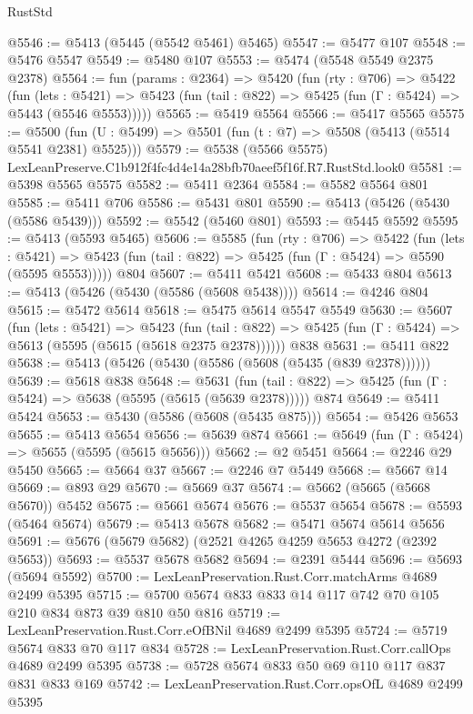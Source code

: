 \begin{lexlean}{RustStd}
\begin{coremodule}
@5546 := @5413 (@5445 (@5542 @5461) @5465)
@5547 := @5477 @107
@5548 := @5476 @5547
@5549 := @5480 @107
@5553 := @5474 (@5548 @5549 @2375 @2378)
@5564 := fun (params : @2364) =>
  @5420
    (fun (rty : @706) =>
    @5422
      (fun (lets : @5421) =>
      @5423 (fun (tail : @822) => @5425 (fun (Γ : @5424) => @5443 (@5546 @5553)))))
@5565 := @5419 @5564
@5566 := @5417 @5565
@5575 := @5500 (fun (U : @5499) => @5501 (fun (t : @7) => @5508 (@5413 (@5514 @5541 @2381) @5525)))
@5579 := @5538 (@5566 @5575) LexLeanPreserve.C1b912f4fc4d4e14a28bfb70aeef5f16f.R7.RustStd.look0
@5581 := @5398 @5565 @5575
@5582 := @5411 @2364
@5584 := @5582 @5564 @801
@5585 := @5411 @706
@5586 := @5431 @801
@5590 := @5413 (@5426 (@5430 (@5586 @5439)))
@5592 := @5542 (@5460 @801)
@5593 := @5445 @5592
@5595 := @5413 (@5593 @5465)
@5606 := @5585
    (fun (rty : @706) =>
    @5422
      (fun (lets : @5421) =>
      @5423 (fun (tail : @822) => @5425 (fun (Γ : @5424) => @5590 (@5595 @5553)))))
    @804
@5607 := @5411 @5421
@5608 := @5433 @804
@5613 := @5413 (@5426 (@5430 (@5586 (@5608 @5438))))
@5614 := @4246 @804
@5615 := @5472 @5614
@5618 := @5475 @5614 @5547 @5549
@5630 := @5607
    (fun (lets : @5421) =>
    @5423
      (fun (tail : @822) => @5425 (fun (Γ : @5424) => @5613 (@5595 (@5615 (@5618 @2375 @2378))))))
    @838
@5631 := @5411 @822
@5638 := @5413 (@5426 (@5430 (@5586 (@5608 (@5435 (@839 @2378))))))
@5639 := @5618 @838
@5648 := @5631
    (fun (tail : @822) => @5425 (fun (Γ : @5424) => @5638 (@5595 (@5615 (@5639 @2378)))))
    @874
@5649 := @5411 @5424
@5653 := @5430 (@5586 (@5608 (@5435 @875)))
@5654 := @5426 @5653
@5655 := @5413 @5654
@5656 := @5639 @874
@5661 := @5649 (fun (Γ : @5424) => @5655 (@5595 (@5615 @5656)))
@5662 := @2 @5451
@5664 := @2246 @29 @5450
@5665 := @5664 @37
@5667 := @2246 @7 @5449
@5668 := @5667 @14
@5669 := @893 @29
@5670 := @5669 @37
@5674 := @5662 (@5665 (@5668 @5670)) @5452
@5675 := @5661 @5674
@5676 := @5537 @5654
@5678 := @5593 (@5464 @5674)
@5679 := @5413 @5678
@5682 := @5471 @5674 @5614 @5656
@5691 := @5676 (@5679 @5682) (@2521 @4265 @4259 @5653 @4272 (@2392 @5653))
@5693 := @5537 @5678 @5682
@5694 := @2391 @5444
@5696 := @5693 (@5694 @5592)
@5700 := LexLeanPreservation.Rust.Corr.matchArms @4689 @2499 @5395
@5715 := @5700 @5674 @833 @833 @14 @117 @742 @70 @105 @210 @834 @873 @39 @810 @50 @816
@5719 := LexLeanPreservation.Rust.Corr.eOfBNil @4689 @2499 @5395
@5724 := @5719 @5674 @833 @70 @117 @834
@5728 := LexLeanPreservation.Rust.Corr.callOps @4689 @2499 @5395
@5738 := @5728 @5674 @833 @50 @69 @110 @117 @837 @831 @833 @169
@5742 := LexLeanPreservation.Rust.Corr.opsOfL @4689 @2499 @5395

\end{coremodule}
\end{lexlean}
